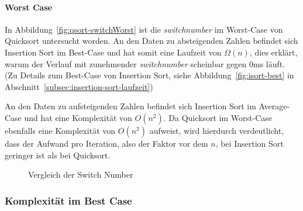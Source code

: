 \paragraph{Worst Case}
In Abbildung~\ref{fig:qsort-switchWorst} ist die \textit{switchnumber} im
Worst-Case von Quicksort untersucht worden.
An den Daten zu absteigenden Zahlen befindet sich Insertion Sort im Best-Case
und hat somit eine Laufzeit von \(\Omega(n)\), dies erklärt, warum der
Verlauf mit zunehmender \textit{switchnumber} scheinbar gegen 0ms läuft.
(Zu Details zum Best-Case von Insertion Sort, siehe
Abbildung~\ref{fig:isort-best} in
Abschnitt~\ref{subsec:insertion-sort-laufzeit})

An den Daten zu aufsteigenden Zahlen befindet sich Insertion Sort im
Average-Case und hat eine Komplexität von \(O(n^2)\).
Da Quicksort im Worst-Case ebenfalls eine Komplexität von \(O(n^2)\)
aufweist, wird hierdurch verdeutlicht, dass der Aufwand pro Iteration, also
der Faktor vor dem \(n\), bei Insertion Sort geringer ist als bei Quicksort.


\begin{figure}[hbt]
    \centering
    \caption{Vergleich der Switch Number}
\end{figure}

\subsubsection{Komplexität im Best Case}\label{subsubsec:qsort-best-case}

